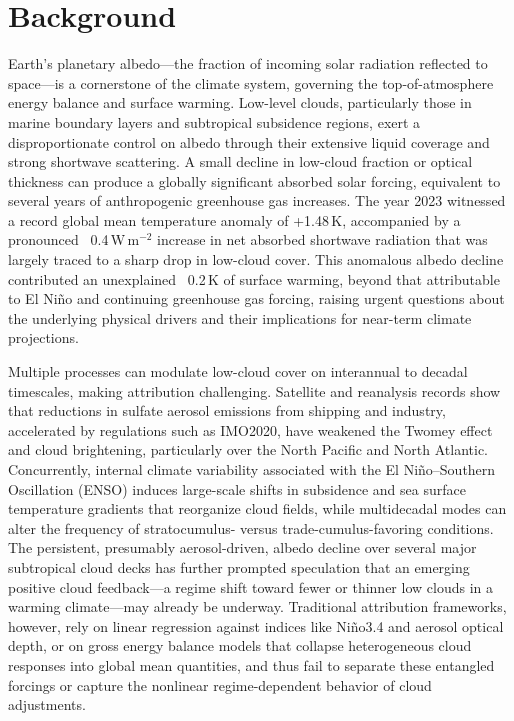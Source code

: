 \documentclass{article}
\begin{document}
\section{Background}
Earth's planetary albedo—the fraction of incoming solar radiation reflected to space—is a cornerstone of the climate system, governing the top-of-atmosphere energy balance and surface warming. Low-level clouds, particularly those in marine boundary layers and subtropical subsidence regions, exert a disproportionate control on albedo through their extensive liquid coverage and strong shortwave scattering. A small decline in low-cloud fraction or optical thickness can produce a globally significant absorbed solar forcing, equivalent to several years of anthropogenic greenhouse gas increases. The year 2023 witnessed a record global mean temperature anomaly of +1.48\,K, accompanied by a pronounced ~0.4\,W\,m\(^{-2}\) increase in net absorbed shortwave radiation that was largely traced to a sharp drop in low-cloud cover. This anomalous albedo decline contributed an unexplained ~0.2\,K of surface warming, beyond that attributable to El Niño and continuing greenhouse gas forcing, raising urgent questions about the underlying physical drivers and their implications for near-term climate projections.

Multiple processes can modulate low-cloud cover on interannual to decadal timescales, making attribution challenging. Satellite and reanalysis records show that reductions in sulfate aerosol emissions from shipping and industry, accelerated by regulations such as IMO2020, have weakened the Twomey effect and cloud brightening, particularly over the North Pacific and North Atlantic. Concurrently, internal climate variability associated with the El Niño–Southern Oscillation (ENSO) induces large-scale shifts in subsidence and sea surface temperature gradients that reorganize cloud fields, while multidecadal modes can alter the frequency of stratocumulus- versus trade-cumulus-favoring conditions. The persistent, presumably aerosol-driven, albedo decline over several major subtropical cloud decks has further prompted speculation that an emerging positive cloud feedback—a regime shift toward fewer or thinner low clouds in a warming climate—may already be underway. Traditional attribution frameworks, however, rely on linear regression against indices like Niño3.4 and aerosol optical depth, or on gross energy balance models that collapse heterogeneous cloud responses into global mean quantities, and thus fail to separate these entangled forcings or capture the nonlinear regime-dependent behavior of cloud adjustments.
\end{document}
